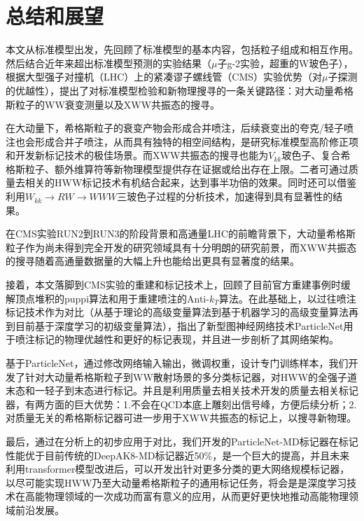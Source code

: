 \chapter{总结和展望}
\fontsize{12bp}{14.4pt}

本文从标准模型出发，先回顾了标准模型的基本内容，包括粒子组成和相互作用。然后结合近年来超出标准模型预测的实验结果（$\mu$子g-2实验，超重的W玻色子），根据大型强子对撞机（LHC）上的紧凑谬子螺线管（CMS）实验优势（对$\mu$子探测的优越性），提出了对标准模型检验和新物理搜寻的一条关键路径：对大动量希格斯粒子的WW衰变测量以及XWW共振态的搜寻。

在大动量下，希格斯粒子的衰变产物会形成合并喷注，后续衰变出的夸克/轻子喷注也会形成合并子喷注，从而具有独特的相空间结构，是研究标准模型高阶修正项和开发新标记技术的极佳场景。而XWW共振态的搜寻也能为$V_{kk}$玻色子、复合希格斯粒子、额外维算符等新物理模型提供存在证据或给出存在上限。二者可通过质量去相关的HWW标记技术有机结合起来，达到事半功倍的效果。同时还可以借鉴利用$W_{kk}\to RW\to WWW$三玻色子过程的分析技术，加速得到具有显著性的结果。

在CMS实验RUN2到RUN3的阶段背景和高通量LHC的前瞻背景下，大动量希格斯粒子作为尚未得到完全开发的研究领域具有十分明朗的研究前景，而XWW共振态的搜寻随着高通量数据量的大幅上升也能给出更具有显著度的结果。

接着，本文落脚到CMS实验的重建和标记技术上，回顾了目前官方重建事例时缓解顶点堆积的puppi算法和用于重建喷注的Anti-$k_T$算法。在此基础上，以过往喷注标记技术作为对比（从基于理论的高级变量算法到基于机器学习的高级变量算法再到目前基于深度学习的初级变量算法），指出了新型图神经网络技术ParticleNet用于喷注标记的物理优越性和更好的标记表现，并且进一步剖析了其网络架构。

基于ParticleNet，通过修改网络输入输出，微调权重，设计专门训练样本，我们开发了针对大动量希格斯粒子到WW散射场景的多分类标记器，对HWW的全强子道末态和一轻子到末态进行标记。并且是利用质量去相关技术开发的质量去相关标记器，有两方面的巨大优势：1.不会在QCD本底上雕刻出信号峰，方便后续分析；2.对质量无关的希格斯标记器可进一步用于XWW共振态的标记上，以搜寻新物理。

最后，通过在分析上的初步应用于对比，我们开发的ParticleNet-MD标记器在标记性能优于目前传统的DeepAK8-MD标记器近50\%，是一个巨大的提高，并且未来利用transformer模型改进后，可以开发出针对更多分类的更大网络规模标记器，以尽可能实现HWW乃至大动量希格斯粒子的通用标记任务，将会是是深度学习技术在高能物理领域的一次成功而富有意义的应用，从而更好更快地推动高能物理领域前沿发展。